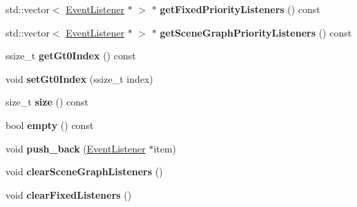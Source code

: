 \begin{DoxyCompactItemize}
std\+::vector$<$ \hyperlink{classEventListener}{Event\+Listener} $\ast$ $>$ $\ast$ {\bfseries get\+Fixed\+Priority\+Listeners} () const
\item 
\mbox{\label{classEventDispatcher_1_1EventListenerVector_a1ae71a8f414ac4cb179126b8df34841c}} 
std\+::vector$<$ \hyperlink{classEventListener}{Event\+Listener} $\ast$ $>$ $\ast$ {\bfseries get\+Scene\+Graph\+Priority\+Listeners} () const
\item 
\mbox{\label{classEventDispatcher_1_1EventListenerVector_a2de97d574940a3049755af49be125c4a}} 
ssize\+\_\+t {\bfseries get\+Gt0\+Index} () const
\item 
\mbox{\label{classEventDispatcher_1_1EventListenerVector_a30edf81549b8d6968485ce9c9ac6da0a}} 
void {\bfseries set\+Gt0\+Index} (ssize\+\_\+t index)
\item 
\mbox{\label{classEventDispatcher_1_1EventListenerVector_af3b9a511d39a9b31873cbd48934b0f08}} 
size\+\_\+t {\bfseries size} () const
\item 
\mbox{\label{classEventDispatcher_1_1EventListenerVector_a2b3db7d00edfe4a107901eb70e0015e4}} 
bool {\bfseries empty} () const
\item 
\mbox{\label{classEventDispatcher_1_1EventListenerVector_a959b26be9ea1901b46205926603fc9c0}} 
void {\bfseries push\+\_\+back} (\hyperlink{classEventListener}{Event\+Listener} $\ast$item)
\item 
\mbox{\label{classEventDispatcher_1_1EventListenerVector_a0e8410e818d5305bfc38c63d92bd381c}} 
void {\bfseries clear\+Scene\+Graph\+Listeners} ()
\item 
\mbox{\label{classEventDispatcher_1_1EventListenerVector_a524f42ae89fa294a3a142ac95ac463c2}} 
void {\bfseries clear\+Fixed\+Listeners} ()
\item 
\mbox{\label{classEventDispatcher_1_1EventListenerVector_a4d6548e2ec3d542fac5de6bbc508f683}} 

\end{DoxyCompactItemize}
